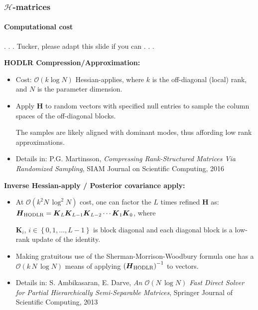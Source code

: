 \documentclass[10pt,final,xcolor=dvipsnames]{beamer}
\newcommand{\bs}[1]{\ensuremath{\boldsymbol{#1}}}
\begin{document}
\begin{frame}
  \frametitle{$\mathcal{H}$-matrices}
  \framesubtitle{Computational cost}

  . . .  Tucker, please adapt this slide if you can . . .
  
\noindent \textbf{HODLR Compression/Approximation:}
\begin{itemize}
\item Cost: $\mathcal{O} (k \log N)$ Hessian-applies, where $k$ is the
  off-diagonal (local) rank, and $N$ is the parameter dimension.
\item Apply $\bs{H}$ to random vectors with specified null entries to
  sample the column spaces of the off-diagonal blocks.
\vspace{1mm}

The samples are likely aligned with dominant modes, thus affording low
rank approximations.

\item [] \scriptsize{Details in: P.G. Martinsson, {\em Compressing
    Rank-Structured Matrices Via Randomized Sampling}, SIAM Journal on
  Scientific Computing, 2016}
\end{itemize}
\vspace{1mm}

\noindent \textbf{Inverse Hessian-apply / Posterior covariance apply:}
\begin{itemize}
\item At $\mathcal{O}\left(k^2 N\,\log^{2} N \right)$ cost, one can
  factor the $L$ times refined $\boldsymbol{H}$ as:
  $\boldsymbol{H}_{\rm
    HODLR}=\boldsymbol{K}_{L}\boldsymbol{K}_{L-1}\boldsymbol{K}_{L-2}\cdots\boldsymbol{K}_{1}\boldsymbol{K}_{0}$,
  where

$\bs{K}_{i}$, $i\in\left\{0,1,\dots,L-1\right\}$ is block diagonal and
  each diagonal block is a low-rank update of the identity.
\item Making gratuitous use of the Sherman-Morrison-Woodbury formula
  one has a $\mathcal{O}\left(k \, N\,\log N \right)$ means of
  applying $\left(\bs{H}_{\rm HODLR}\right)^{-1}$ to vectors.
\item [] \scriptsize{Details in: S. Ambikasaran, E. Darve, {\em An
    $\mathcal{O}(N\, \log N)$ Fast Direct Solver for Partial
    Hierarchically Semi-Separable Matrices}, Springer Journal of
  Scientific Computing, 2013}
\end{itemize}
\vspace{1mm}
\end{frame}
\end{document}

